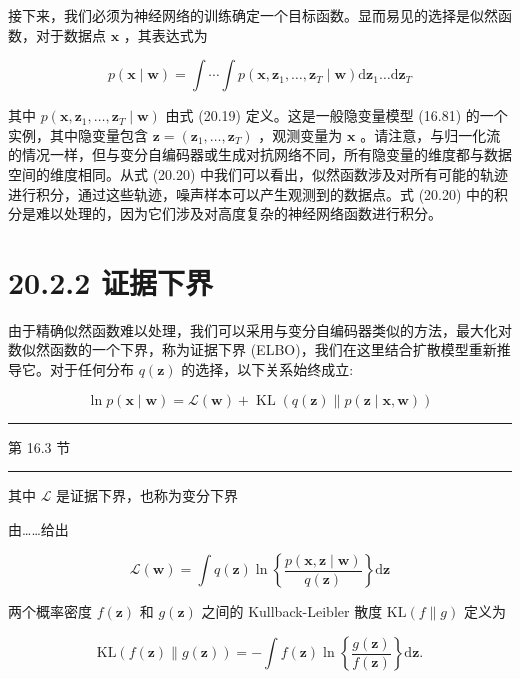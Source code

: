 \documentclass[10pt]{article}
\newcommand{\HRule}{\begin{center}\rule{0.9\linewidth}{0.2mm}\end{center}}
\begin{document}
接下来，我们必须为神经网络的训练确定一个目标函数。显而易见的选择是似然函数，对于数据点 \(\mathbf{x}\) ，其表达式为

\[
p\left( {\mathbf{x} \mid  \mathbf{w}}\right)  = \int \cdots \int p\left( {\mathbf{x},{\mathbf{z}}_{1},\ldots ,{\mathbf{z}}_{T} \mid  \mathbf{w}}\right) \mathrm{d}{\mathbf{z}}_{1}\ldots \mathrm{d}{\mathbf{z}}_{T} \tag{20.20}
\]

其中 \(p\left( {\mathbf{x},{\mathbf{z}}_{1},\ldots ,{\mathbf{z}}_{T} \mid  \mathbf{w}}\right)\) 由式 (20.19) 定义。这是一般隐变量模型 (16.81) 的一个实例，其中隐变量包含 \(\mathbf{z} = \left( {{\mathbf{z}}_{1},\ldots ,{\mathbf{z}}_{T}}\right)\) ，观测变量为 \(\mathbf{x}\) 。请注意，与归一化流的情况一样，但与变分自编码器或生成对抗网络不同，所有隐变量的维度都与数据空间的维度相同。从式 (20.20) 中我们可以看出，似然函数涉及对所有可能的轨迹进行积分，通过这些轨迹，噪声样本可以产生观测到的数据点。式 (20.20) 中的积分是难以处理的，因为它们涉及对高度复杂的神经网络函数进行积分。

\section*{20.2.2 证据下界}

由于精确似然函数难以处理，我们可以采用与变分自编码器类似的方法，最大化对数似然函数的一个下界，称为证据下界 (ELBO)，我们在这里结合扩散模型重新推导它。对于任何分布 \(q\left( \mathbf{z}\right)\) 的选择，以下关系始终成立:

\[
\ln p\left( {\mathbf{x} \mid  \mathbf{w}}\right)  = \mathcal{L}\left( \mathbf{w}\right)  + \operatorname{KL}\left( {q\left( \mathbf{z}\right) \parallel p\left( {\mathbf{z} \mid  \mathbf{x},\mathbf{w}}\right) }\right)  \tag{20.21}
\]

\HRule

第 16.3 节

\HRule

其中 \(\mathcal{L}\) 是证据下界，也称为变分下界

由……给出

\[
\mathcal{L}\left( \mathbf{w}\right)  = \int q\left( \mathbf{z}\right) \ln \left\{  \frac{p\left( {\mathbf{x},\mathbf{z} \mid  \mathbf{w}}\right) }{q\left( \mathbf{z}\right) }\right\}  \mathrm{d}\mathbf{z} \tag{20.22}
\]

两个概率密度 \(f\left( \mathbf{z}\right)\) 和 \(g\left( \mathbf{z}\right)\) 之间的 Kullback-Leibler 散度 \(\mathrm{{KL}}\left( {f\parallel g}\right)\) 定义为

\[
\mathrm{{KL}}\left( {f\left( \mathbf{z}\right) \parallel g\left( \mathbf{z}\right) }\right)  =  - \int f\left( \mathbf{z}\right) \ln \left\{  \frac{g\left( \mathbf{z}\right) }{f\left( \mathbf{z}\right) }\right\}  \mathrm{d}\mathbf{z}. \tag{20.23}
\]
\end{document}
